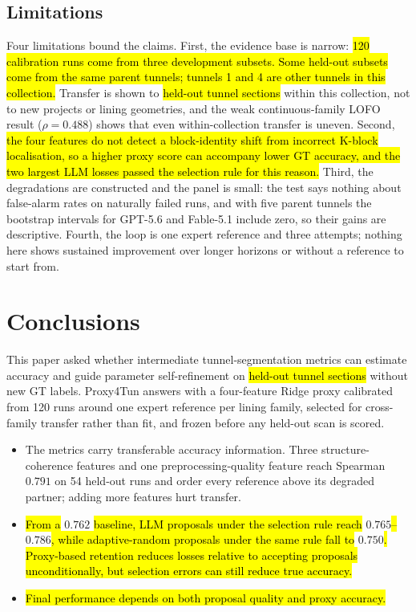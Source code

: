 \documentclass[a4paper,fleqn]{cas-dc}
\begin{document}
{\subsection{Limitations}\label{sec:limitations}

Four limitations bound the claims. First, the evidence base is narrow: \hl{120 calibration runs come from three development subsets. Some held-out subsets come from the same parent tunnels; tunnels 1 and 4 are other tunnels in this collection.} Transfer is shown to \hl{held-out tunnel sections} within this collection, not to new projects or lining geometries, and the weak continuous-family LOFO result ($\rho=0.488$) shows that even within-collection transfer is uneven. Second, \hl{the four features do not detect a block-identity shift from incorrect K-block localisation, so a higher proxy score can accompany lower GT accuracy, and the two largest LLM losses passed the selection rule for this reason.} Third, the degradations are constructed and the panel is small: the test says nothing about false-alarm rates on naturally failed runs, and with five parent tunnels the bootstrap intervals for GPT-5.6 and Fable-5.1 include zero, so their gains are descriptive. Fourth, the loop is one expert reference and three attempts; nothing here shows sustained improvement over longer horizons or without a reference to start from.


\section{Conclusions}\label{sec:conclusions}

This paper asked whether intermediate tunnel-segmentation metrics can estimate accuracy and guide parameter self-refinement on \hl{held-out tunnel sections} without new GT labels. Proxy4Tun answers with a four-feature Ridge proxy calibrated from 120 runs around one expert reference per lining family, selected for cross-family transfer rather than fit, and frozen before any held-out scan is scored.

\begin{itemize}
\item The metrics carry transferable accuracy information. Three structure-coherence features and one preprocessing-quality feature reach Spearman $0.791$ on 54 held-out runs and order every reference above its degraded partner; adding more features hurt transfer.
\item \hl{From a} $0.762$ \hl{baseline, LLM proposals under the selection rule reach} $0.765$\hl{--}$0.786$\hl{, while adaptive-random proposals under the same rule fall to} $0.750$\hl{. Proxy-based retention reduces losses relative to accepting proposals unconditionally, but selection errors can still reduce true accuracy.}
\item \hl{Final performance depends on both proposal quality and proxy accuracy.}
\end{itemize}

}
\end{document}

